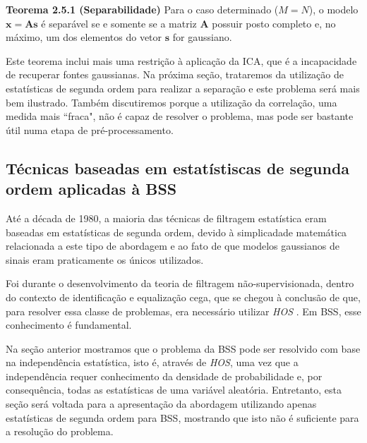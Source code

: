     \bigskip
    
    \textbf{Teorema 2.5.1 (Separabilidade)} Para o caso determinado ($M=N$), o modelo $\mathbf{x=As}$ é separável se e somente se a matriz $\mathbf{A}$ possuir posto completo e, no máximo, um dos elementos do vetor $\mathbf{s}$ for gaussiano.
    
    \bigskip
    
    Este teorema inclui mais uma restrição à aplicação da ICA, que é a incapacidade de recuperar fontes gaussianas. Na próxima seção, trataremos da utilização de estatísticas de segunda ordem para realizar a separação e este problema será mais bem ilustrado. Também discutiremos porque a utilização da correlação, uma medida mais ``fraca", não é capaz de resolver o problema, mas pode ser bastante útil numa etapa de pré-processamento.
  
\subsection{Técnicas baseadas em estatístiscas de segunda ordem aplicadas à BSS}\label{secondorder}

    Até a década de 1980, a maioria das técnicas de filtragem estatística eram baseadas em estatísticas de segunda ordem, devido à simplicadade matemática relacionada a este tipo de abordagem e ao fato de que modelos gaussianos de sinais eram praticamente os únicos utilizados. 
    
    Foi durante o desenvolvimento da teoria de filtragem não-supervisionada, dentro do contexto de identificação e equalização cega, que se chegou à conclusão de que, para resolver essa classe de problemas, era necessário utilizar \textit{HOS} \cite{HOS}. Em BSS, esse conhecimento é fundamental.
    
    Na seção anterior mostramos que o problema da BSS pode ser resolvido com base na independência estatística, isto é, através de \textit{HOS}, uma vez que a independência requer conhecimento da densidade de probabilidade e, por consequência, todas as estatísticas de uma variável aleatória. Entretanto, esta seção será voltada para a apresentação da abordagem utilizando apenas estatísticas de segunda ordem para BSS, mostrando que isto não é suficiente para a resolução do problema.
    
